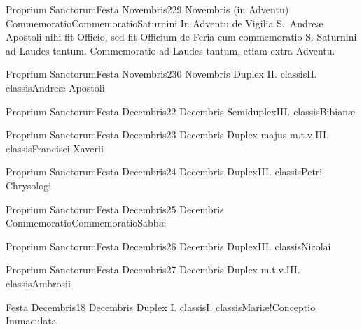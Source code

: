 \documentclass[liber-responsorialis_hiemalis.tex]{subfiles}
\begin{document}

	{Proprium Sanctorum}{Festa Novembris}{2}{29 Novembris (in Adventu)}
	{Commemoratio}{Commemoratio}{Saturnini}
	{In Adventu de Vigilia S.\ Andreæ Apostoli nihi fit Officio, sed fit Officium de Feria cum commemoratio S. Saturnini ad Laudes tantum.}
	{Commemoratio ad Laudes tantum, etiam extra Adventu.}
\rubric{\respdetemp}

	{Proprium Sanctorum}{Festa Novembris}{2}{30 Novembris}
	{Duplex II. classis}{II. classis}{Andreæ Apostoli}
	{}
	{}


	{Proprium Sanctorum}{Festa Decembris}{2}{2 Decembris}
	{Semiduplex}{III. classis}{Bibianæ}
	{\vmrubric}
	{\respdetemp}

	{Proprium Sanctorum}{Festa Decembris}{2}{3 Decembris}
	{Duplex majus m.t.v.}{III. classis}{Francisci Xaverii}
	{\conprubric}
	{\respdetemp}

	{Proprium Sanctorum}{Festa Decembris}{2}{4 Decembris}
	{Duplex}{III. classis}{Petri Chrysologi}
	{\copodorubric}
	{\respdetemp}

	{Proprium Sanctorum}{Festa Decembris}{2}{5 Decembris}
	{Commemoratio}{Commemoratio}{Sabbæ}
	{}
	{}
\rubric{\respdetemp}

	{Proprium Sanctorum}{Festa Decembris}{2}{6 Decembris}
	{Duplex}{III. classis}{Nicolai}
	{\coporubric}
	{\respdetemp}

	{Proprium Sanctorum}{Festa Decembris}{2}{7 Decembris}
	{Duplex m.t.v.}{III. classis}{Ambrosii}
	{\copodorubric}
	{\respdetemp}

	{Festa Decembris}{1}{8 Decembris}
	{Duplex I. classis}{I. classis}{Mariæ!Conceptio Immaculata}
	{}
	{}
\end{document}
